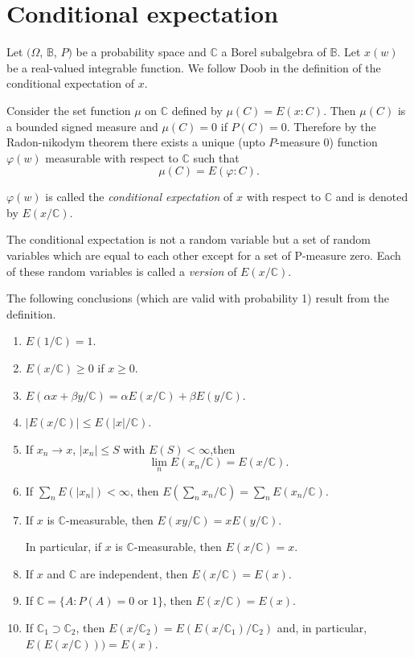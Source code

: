 \section{Conditional expectation}\label{chap0-sec4}  

Let $(\Omega$, $ \mathbb{B}$, $ P)$ be a probability space and
$\mathbb{C}$ a Borel subalgebra of $\mathbb{B}$. Let $x(w)$ be a
real-valued integrable function. We follow Doob in the definition of
the conditional expectation of $x$. 

Consider the set function $\mu$ on $\mathbb{C}$ defined by $\mu(C)=
E(x:C)$. Then $\mu (C)$ is a bounded signed measure and $\mu(C)=0$ 
if $P(C) =0$. Therefore by the Radon-nikodym
theorem there exists a unique (upto $P$-measure $0$) function $\varphi
(w)$ measurable with respect to $\mathbb{C}$ such that  
$$
\mu (C) = E (\varphi : C).
$$

\begin{defi*}
$\varphi (w)$ is called the {\em conditional expectation } of $x$
  with respect to $\mathbb{C}$ and is denoted by $E(x/ \mathbb{C})$. 
\end{defi*}  

The conditional expectation is not a random variable but a set of
random variables which are equal to each other except for a set of
P-measure zero. Each of these random variables is called a
\textit{version} of $E(x/ \mathbb{C})$. 

The following conclusions (which are valid with probability 1) result
from the definition. 
\begin{enumerate}
\item $E(1 / \mathbb{C}) = 1$.\pageoriginale
\item $E(x / \mathbb{C}) \geq 0 $ if $x \geq 0$.
\item $E(\alpha x + \beta y / \mathbb{C}) = \alpha E(x/ \mathbb{C}) +
  \beta E (y / \mathbb{C})$. 
\item $| E(x / \mathbb{C})| \leq E( |x| / \mathbb{C})$.
\item If $x_n \to x$, $ |x_n| \leq S$ with $E(S) < \infty$,then 
  $$
  \lim_n E(x_n / \mathbb{C}) = E(x / \mathbb{C}).
  $$

\item If $\sum_n E(|x_n|) < \infty$, then $E( \sum \limits_n x_n /
  \mathbb{C})= \sum \limits_n E(x_n / \mathbb{C})$. 

\item If $x$ is $\mathbb{C}$-measurable, then $E(xy / \mathbb{C}) =
  xE(y / \mathbb{C})$. 

  In particular, if $x$ is $ \mathbb{C}$-measurable, then $E(x / \mathbb{C})=x$.
\item If $x$ and $\mathbb{C}$ are independent, then $E(x / \mathbb{C}) = E(x)$.
\item If $\mathbb{C} = \{ A: P(A) = 0 \text{ or } 1 \}$, then $E(x /
  \mathbb{C}) = E(x)$. 
\item If $ \mathbb{C}_1 \supset  \mathbb{C}_2$, then $E(x /
  \mathbb{C}_2) = E (E(x / \mathbb{C}_1) /\mathbb{C}_2)$ and, in
  particular, \break $E(E(x / \mathbb{C}))) = E(x)$. 
\end{enumerate}

